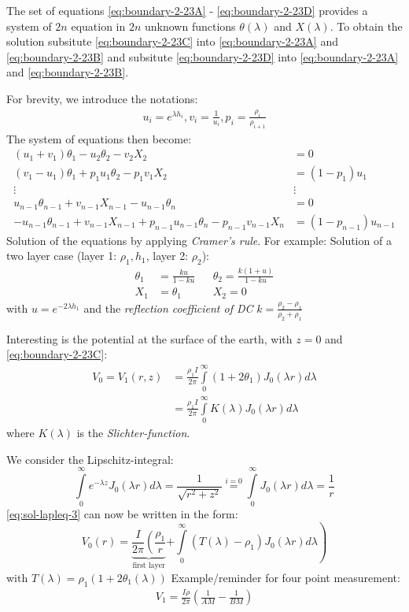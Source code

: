 The set of equations \eqref{eq:boundary-2-23A} - \eqref{eq:boundary-2-23D} provides a system of $2n$ equation in $2n$ unknown functions $\theta(\lambda)$ and $X(\lambda)$. To obtain the solution subsitute \eqref{eq:boundary-2-23C} into \eqref{eq:boundary-2-23A} and \eqref{eq:boundary-2-23B} and subsitute \eqref{eq:boundary-2-23D} into \eqref{eq:boundary-2-23A} and \eqref{eq:boundary-2-23B}.

For brevity, we introduce the notations:
\begin{align*}
u_i=e^{\lambda h_i}, v_i=\frac{1}{u_i}, p_i=\frac{\rho_i}{\rho_{i+1}}
\end{align*}
The system of equations then become:
\begin{align*}
(u_1+v_1)\theta_1-u_2\theta_2-v_2X_2&=0\\
(v_1-u_1)\theta_1+p_1u_1\theta_2-p_1v_1X_2&=(1-p_1)u_1\\
\vdots~~~~~~~~~~~~~~~~~~~~&\vdots\\
u_{n-1}\theta_{n-1}+v_{n-1}X_{n-1}-u_{n-1}\theta_n&=0\\
-u_{n-1}\theta_{n-1}+v_{n-1}X_{n-1}+p_{n-1}u_{n-1}\theta_n-p_{n-1}v_{n-1}X_n&=(1-p_{n-1})u_{n-1}
\end{align*}
Solution of the equations by applying \textit{Cramer's rule}. For example: Solution of a two layer case (layer 1: $\rho_1, h_1$, layer 2: $\rho_2$):
\begin{align*}
\theta_1&=\frac{ku}{1-ku} && \theta_2=\frac{k(1+u)}{1-ku}\\
X_1&=\theta_1 && X_2=0
\end{align*}
with $u=e^{-2\lambda h_1}$ and the \textit{reflection coefficient of DC} $k=\frac{\rho_2-\rho_1}{\rho_2+\rho_1}$

Interesting is the potential at the surface of the earth, with $z=0$ and \eqref{eq:boundary-2-23C}:
\begin{align}
V_0=V_1(r,z)&=\frac{\rho_1 I}{2\pi}\int\limits_{0}^{\infty}\left(1+2\theta_1\right)J_0(\lambda r)d\lambda\\
&=\frac{\rho_1 I}{2\pi}\int\limits_{0}^{\infty}K(\lambda)J_0(\lambda r)d\lambda
\end{align}
where $K(\lambda)$ is the \textit{Slichter-function}.

We consider the Lipschitz-integral:
\begin{equation}
\int\limits_{0}^{\infty}e^{-\lambda z}J_0(\lambda r)d\lambda=\frac{1}{\sqrt{r^2+z^2}}\stackrel{i=0}= \int\limits_{0}^{\infty}J_0(\lambda r)d\lambda=\frac{1}{r}
\end{equation}
\eqref{eq:sol-lapleq-3} can now be written in the form:
\begin{equation}
V_0(r)=\underbrace{\frac{I}{2\pi}\left(\frac{\rho_1}{r}\right.}_{\textrm{first layer}}\left.+\int\limits_{0}^{\infty}(T(\lambda)-\rho_1)J_0(\lambda r)d\lambda\right)
\end{equation}
with $T(\lambda)=\rho_1(1+2\theta_1(\lambda))$
Example/reminder for four point measurement:
\begin{align*}
V_1=\frac{I\rho}{2\pi}\left(\frac{1}{AM}-\frac{1}{BM}\right)
\label{eq:V0}
\end{align*}

